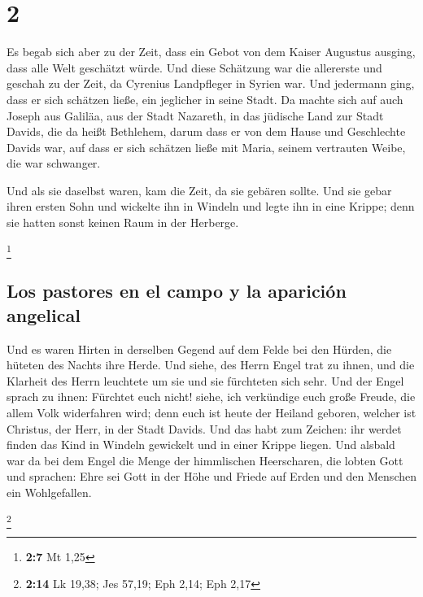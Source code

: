 \hypertarget{section-1}{%
\section{2}\label{section-1}}

 Es begab sich aber zu der Zeit, dass ein Gebot von dem
Kaiser Augustus ausging, dass alle Welt geschätzt würde. 
Und diese Schätzung war die allererste und geschah zu der Zeit, da
Cyrenius Landpfleger in Syrien war.  Und jedermann ging,
dass er sich schätzen ließe, ein jeglicher in seine Stadt.
 Da machte sich auf auch Joseph aus Galiläa, aus der Stadt
Nazareth, in das jüdische Land zur Stadt Davids, die da heißt Bethlehem,
darum dass er von dem Hause und Geschlechte Davids war, 
auf dass er sich schätzen ließe mit Maria, seinem vertrauten Weibe, die
war schwanger.

 Und als sie daselbst waren, kam die Zeit, da sie gebären
sollte.  Und sie gebar ihren ersten Sohn und wickelte ihn
in Windeln und legte ihn in eine Krippe; denn sie hatten sonst keinen
Raum in der Herberge.

\footnote{\textbf{2:7} Mt 1,25}

\hypertarget{los-pastores-en-el-campo-y-la-apariciuxf3n-angelical}{%
\subsection{Los pastores en el campo y la aparición
angelical}\label{los-pastores-en-el-campo-y-la-apariciuxf3n-angelical}}

 Und es waren Hirten in derselben Gegend auf dem Felde bei
den Hürden, die hüteten des Nachts ihre Herde.  Und siehe,
des Herrn Engel trat zu ihnen, und die Klarheit des Herrn leuchtete um
sie und sie fürchteten sich sehr.  Und der Engel sprach
zu ihnen: Fürchtet euch nicht! siehe, ich verkündige euch große Freude,
die allem Volk widerfahren wird;  denn euch ist heute der
Heiland geboren, welcher ist Christus, der Herr, in der Stadt Davids.
 Und das habt zum Zeichen: ihr werdet finden das Kind in
Windeln gewickelt und in einer Krippe liegen.  Und
alsbald war da bei dem Engel die Menge der himmlischen Heerscharen, die
lobten Gott und sprachen:  Ehre sei Gott in der Höhe und
Friede auf Erden und den Menschen ein Wohlgefallen.

\footnote{\textbf{2:14} Lk 19,38; Jes 57,19; Eph 2,14; Eph 2,17}

